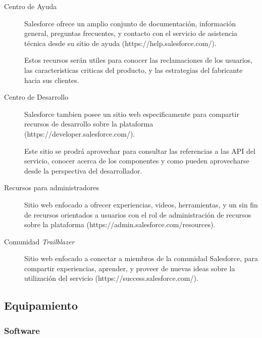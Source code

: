\begin{description}
\item [Centro de Ayuda] Salesforce ofrece un amplio conjunto de documentación,
información general, preguntas frecuentes, y contacto con el servicio de
asistencia técnica desde su sitio de ayuda (https://help.salesforce.com/).

Estos recursos serán utiles para conocer las reclamaciones de los usuarios, las
caracteristicas criticas del producto, y las estrategias del fabricante hacia
sus clientes.

\item [Centro de Desarrollo] Salesforce tambien posee un sitio web
especificamente para compartir recursos de desarrollo sobre la plataforma
(https://developer.salesforce.com/).

Este sitio se prodrá aprovechar para consultar las referencias a las API del
servicio, conocer acerca de los componentes y como pueden aprovecharse desde la
perspectiva del desarrollador.

\item [Recursos para administradores] Sitio web enfocado a ofrecer experiencias,
videos, herramientas, y un sin fin de recursos orientados a usuarios con el rol
de administración de recursos sobre la plataforma
(https://admin.salesforce.com/resources).

\item [Comunidad \emph{Trailblazer}] Sitio web enfocado a conectar a miembros de
la comunidad Salesforce, para compartir experiencias, aprender, y proveer de
nuevas ideas sobre la utilización del servicio
(https://success.salesforce.com/).

\end{description}

\subsection{Equipamiento}
\subsubsection{Software}
